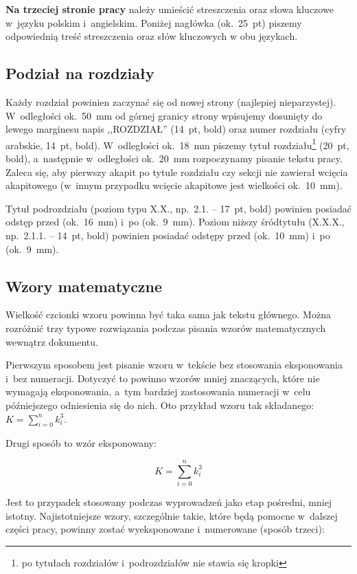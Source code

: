 \documentclass[skorowidz,skroty]{dyplomWEZUT}
\begin{document}
\textbf{Na trzeciej stronie pracy} należy umieścić streszczenia oraz słowa kluczowe w~języku polskim i~angielskim. Poniżej nagłówka (ok.~25~pt) piszemy odpowiednią treść streszczenia oraz słów kluczowych w obu językach.

\subsection{Podział na rozdziały}

Każdy rozdział powinien zaczynać się od nowej strony (najlepiej nieparzystej). W~odległości ok.~50~mm od górnej granicy strony wpisujemy dosunięty do lewego marginesu napis ,,ROZDZIAŁ'' (14~pt, bold) oraz numer rozdziału (cyfry arabskie, 14~pt, bold). W~odległości ok.~18~mm piszemy tytuł rozdziału\footnote{po tytułach rozdziałów i~podrozdziałów nie stawia się kropki} (20~pt, bold), a~następnie w~odległości ok.~20~mm rozpoczynamy pisanie tekstu pracy. Zaleca się, aby pierwszy akapit po tytule rozdziału czy sekcji nie zawierał wcięcia akapitowego (w~innym przypadku wcięcie akapitowe jest wielkości ok.~10~mm).

Tytuł podrozdziału (poziom typu X.X., np.~2.1. -- 17~pt, bold) powinien posiadać odstęp przed (ok.~16~mm) i~po (ok.~9~mm). Poziom niższy śródtytułu (X.X.X., np.~2.1.1. -- 14~pt, bold) powinien posiadać odstępy przed (ok.~10~mm) i~po (ok.~9~mm).

\subsection{Wzory matematyczne}\label{subsec:equations}

Wielkość czcionki wzoru powinna być taka sama jak tekstu głównego. Można rozróżnić trzy typowe rozwiązania podczas pisania wzorów matematycznych wewnątrz dokumentu.

Pierwszym sposobem jest pisanie wzoru w~tekście bez stosowania eksponowania i~bez numeracji. Dotyczyć to powinno wzorów mniej znaczących, które nie wymagają eksponowania, a~tym bardziej zastosowania numeracji w~celu późniejszego odniesienia się do nich. Oto przykład wzoru tak składanego: $K=\sum_{i=0}^n k_{i}^{3}$.

Drugi sposób to wzór eksponowany:

$$K=\sum_{i=0}^n k_{i}^{3}$$

Jest to przypadek stosowany podczas wyprowadzeń jako etap pośredni, mniej istotny. Najistotniejsze wzory, szczególnie takie, które będą pomocne w~dalszej części pracy, powinny zostać wyeksponowane i~numerowane (sposób trzeci):
\end{document}
